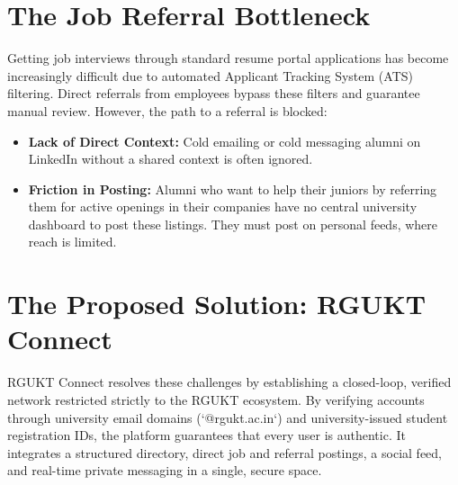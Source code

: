 \section{The Job Referral Bottleneck}
Getting job interviews through standard resume portal applications has become increasingly difficult due to automated Applicant Tracking System (ATS) filtering. Direct referrals from employees bypass these filters and guarantee manual review. However, the path to a referral is blocked:
\begin{itemize}
    \item \textbf{Lack of Direct Context:} Cold emailing or cold messaging alumni on LinkedIn without a shared context is often ignored.
    \item \textbf{Friction in Posting:} Alumni who want to help their juniors by referring them for active openings in their companies have no central university dashboard to post these listings. They must post on personal feeds, where reach is limited.
\end{itemize}

\section{The Proposed Solution: RGUKT Connect}
RGUKT Connect resolves these challenges by establishing a closed-loop, verified network restricted strictly to the RGUKT ecosystem. By verifying accounts through university email domains (`@rgukt.ac.in`) and university-issued student registration IDs, the platform guarantees that every user is authentic. It integrates a structured directory, direct job and referral postings, a social feed, and real-time private messaging in a single, secure space.
